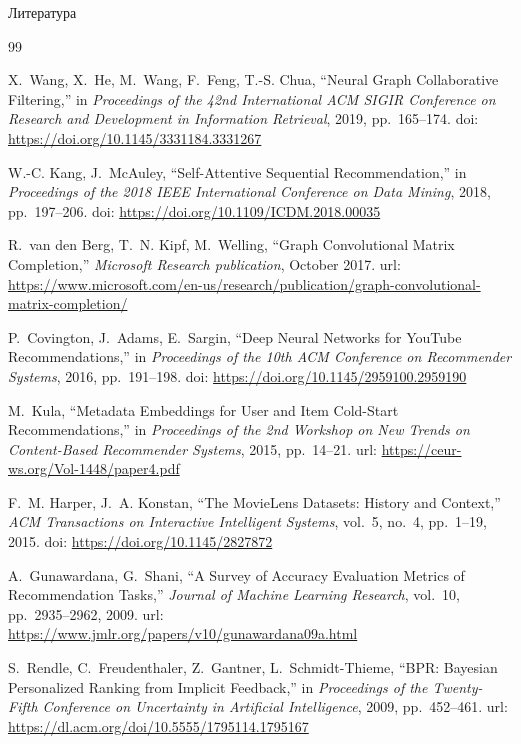 \documentclass{beamer}
\begin{document}
\begin{frame}[allowframebreaks]{Литература}
\footnotesize
{}

\begin{thebibliography}{99}

X.~Wang, X.~He, M.~Wang, F.~Feng, T.-S. Chua,
``Neural Graph Collaborative Filtering,''
in \textit{Proceedings of the 42nd International ACM SIGIR Conference on Research and Development in Information Retrieval},
2019, pp.~165--174.
doi: \url{https://doi.org/10.1145/3331184.3331267}

W.-C. Kang, J.~McAuley,
``Self-Attentive Sequential Recommendation,''
in \textit{Proceedings of the 2018 IEEE International Conference on Data Mining},
2018, pp.~197--206.
doi: \url{https://doi.org/10.1109/ICDM.2018.00035}

R.~van den Berg, T.~N. Kipf, M.~Welling,
``Graph Convolutional Matrix Completion,''
\textit{Microsoft Research publication},
October 2017.
url: \url{https://www.microsoft.com/en-us/research/publication/graph-convolutional-matrix-completion/}

P.~Covington, J.~Adams, E.~Sargin,
``Deep Neural Networks for YouTube Recommendations,''
in \textit{Proceedings of the 10th ACM Conference on Recommender Systems},
2016, pp.~191--198.
doi: \url{https://doi.org/10.1145/2959100.2959190}

M.~Kula,
``Metadata Embeddings for User and Item Cold-Start Recommendations,''
in \textit{Proceedings of the 2nd Workshop on New Trends on Content-Based Recommender Systems},
2015, pp.~14--21.
url: \url{https://ceur-ws.org/Vol-1448/paper4.pdf}

F.~M. Harper, J.~A. Konstan,
``The MovieLens Datasets: History and Context,''
\textit{ACM Transactions on Interactive Intelligent Systems},
vol.~5, no.~4, pp.~1--19, 2015.
doi: \url{https://doi.org/10.1145/2827872}

A.~Gunawardana, G.~Shani,
``A Survey of Accuracy Evaluation Metrics of Recommendation Tasks,''
\textit{Journal of Machine Learning Research},
vol.~10, pp.~2935--2962, 2009.
url: \url{https://www.jmlr.org/papers/v10/gunawardana09a.html}

S.~Rendle, C.~Freudenthaler, Z.~Gantner, L.~Schmidt-Thieme,
``BPR: Bayesian Personalized Ranking from Implicit Feedback,''
in \textit{Proceedings of the Twenty-Fifth Conference on Uncertainty in Artificial Intelligence},
2009, pp.~452--461.
url: \url{https://dl.acm.org/doi/10.5555/1795114.1795167}


\end{thebibliography}
\end{frame}
\end{document}

